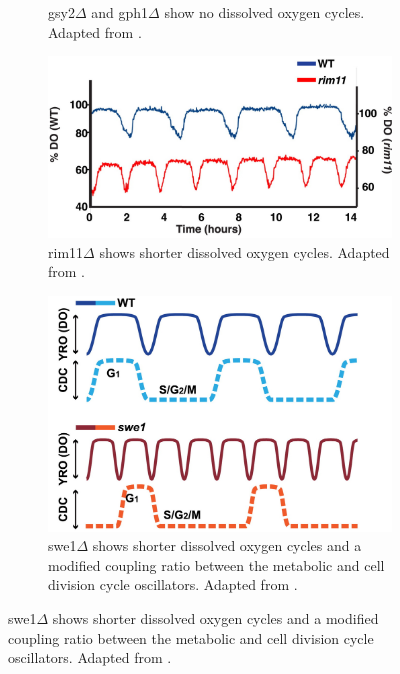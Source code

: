 \begin{figure}
\begin{subfigure}[htpb]{0.4\textwidth}
   \caption{
     gsy2$\Delta$ and gph1$\Delta$ show no dissolved oxygen cycles.
     Adapted from \textcite{oneillEukaryoticCellBiology2020}.
   }
   \label{fig:intro-ymc-gsy2-gph1}
  \end{subfigure}
  \begin{subfigure}[htpb]{0.4\textwidth}
   \centering
   \includegraphics[width=\textwidth]{caustonMetabolicCyclesYeast2015_2e_adapted}
   \caption{
     rim11$\Delta$ shows shorter dissolved oxygen cycles.
     Adapted from \textcite{caustonMetabolicCyclesYeast2015}.
   }
   \label{fig:intro-ymc-rim11}
  \end{subfigure}
  \begin{subfigure}[htpb]{0.4\textwidth}
   \centering
   \includegraphics[width=\textwidth]{caustonMetabolicCyclesYeast2015_1e_adapted}
   \caption{
     swe1$\Delta$ shows shorter dissolved oxygen cycles and a modified coupling ratio between the metabolic and cell division cycle oscillators.
     Adapted from \textcite{caustonMetabolicCyclesYeast2015}.
   }
   \label{fig:intro-ymc-swe1}

\end{subfigure}
\end{figure}
